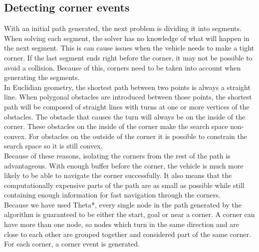 \subsection{Detecting corner events}
With an initial path generated, the next problem is dividing it into segments. When solving each segment, the solver has no knowledge of what will happen in the next segment. This is can cause issues when the vehicle needs to make a tight corner. If the last segment ends right before the corner, it may not be possible to avoid a collision. Because of this, corners need to be taken into account when generating the segments. \\
In Euclidian geometry, the shortest path between two points is always a straight line. When polygonal obstacles are introduced between those points, the shortest path will be composed of straight lines with turns at one or more vertices of the obstacles. The obstacle that causes the turn will always be on the inside of the corner. These obstacles on the inside of the corner make the search space non-convex. For obstacles on the outside of the corner it is possible to constrain the search space so it is still convex.\\
Because of these reasons, isolating the corners from the rest of the path is advantageous. With enough buffer before the corner, the vehicle is much more likely to be able to navigate the corner successfully. It also means that the computationally expensive parts of the path are as small as possible while still containing enough information for fast navigation through the corners.\\
Because we have used Theta*, every single node in the path generated by the algorithm is guaranteed to be either the start, goal or near a corner. A corner can have more than one node, so nodes which turn in the same direction and are close to each other are grouped together and considered part of the same corner. For each corner, a corner event is generated.
